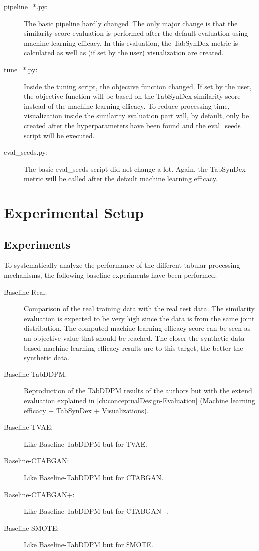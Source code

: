 \begin{description}
	\item[pipeline\_*.py:]
		The basic pipeline hardly changed.
		The only major change is that the similarity score evaluation is performed after the default evaluation using machine learning efficacy.
		In this evaluation, the TabSynDex metric is calculated as well as (if set by the user) visualization are created.

	\item[tune\_*.py:]
		Inside the tuning script, the objective function changed.
		If set by the user, the objective function will be based on the TabSynDex similarity score instead of the machine learning efficacy.
		To reduce processing time, visualization inside the similarity evaluation part will, by default, only be created after the hyperparameters have been found and the eval\_seeds script will be executed.

	\item[eval\_seeds.py:]
		The basic eval\_seeds script did not change a lot.
		Again, the TabSynDex metric will be called after the default machine learning efficacy.
\end{description}

\section{Experimental Setup}
\label{ch:methods-experimentalSetup}

\subsection{Experiments}
\label{ch:Experiments}

To systematically analyze the performance of the different tabular processing mechanisms, the following baseline experiments have been performed:

\begin{description}
	\item[Baseline-Real:] Comparison of the real training data with the real test data.
		The similarity evaluation is expected to be very high since the data is from the same joint distribution.
		The computed machine learning efficacy score can be seen as an objective value that should be reached.
		The closer the synthetic data based machine learning efficacy results are to this target, the better the synthetic data.
	\item[Baseline-TabDDPM:] Reproduction of the TabDDPM results of the authors \cite{kotelnikov2022TabDDPMModellingTabular} but with the extend evaluation explained in \autoref{ch:conceptualDesign-Evaluation} (Machine learning efficacy + TabSynDex + Visualizations).
	\item[Baseline-TVAE:] Like Baseline-TabDDPM but for TVAE.
	\item[Baseline-CTABGAN:] Like Baseline-TabDDPM but for CTABGAN.
	\item[Baseline-CTABGAN+:] Like Baseline-TabDDPM but for CTABGAN+.
	\item[Baseline-SMOTE:] Like Baseline-TabDDPM but for SMOTE.
\end{description}

